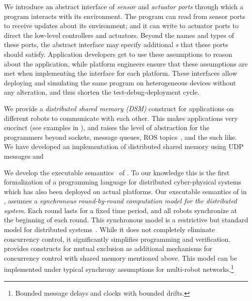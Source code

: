 \begin{noinditem}
\item We introduce an abstract interface of \emph{sensor} and \emph{actuator ports} through which a \lgname program interacts with its environment.
The program can read from sensor ports to receive updates about its environment;
and it can write to actuator ports to direct the low-level controllers and actuators.
Beyond the names and types of these ports, the abstract interface may specify additional \emph{\portasum{}s} that these ports should satisfy.
Application developers get to use these assumptions to reason about the \lgname application,
while platform engineers ensure that these assumptions are met when implementing the interface for each platform.
These interfaces allow deploying and simulating the same \lgname program on heterogeneous devices without any alteration,
and thus shorten the test-debug-deployment cycle.

\item We provide a \emph{distributed shared memory (DSM)} construct for \lgname applications on different robots to communicate with each other.
This makes \lgname applications very succinct (see examples in ),
and raises the level of abstraction for the programmers beyond sockets, message queues, ROS topics~\cite{ros}, and the such like.
We have developed an implementation of distributed shared memory using UDP messages and %

\item We develop the executable \K semantics~\cite{rosu-serbanuta-2013-k} of \lgname.
To our knowledge this is the first formalization of a programming language for distributed cyber-physical systems which has also been deployed on actual platforms.
Our executable semantics of \lgname in \K, assumes a \emph{synchronous round-by-round computation model for the distributed system}.
Each round lasts for a fixed time period, and all robots synchronize at the beginning of each round.
This synchronous model is a restrictive but standard model for distributed systems~\cite{lynch1996a,attiyawelch}.
While it does not completely eliminate concurrency control, it significantly simplifies programming and verification.
\lgname provides constructs for mutual exclusion as additional mechanisms for concurrency control with shared memory mentioned above.
This model can be implemented under typical synchrony assumptions for multi-robot networks.\footnote{Bounded message delays and clocks with bounded drifts.}


\end{noinditem}
